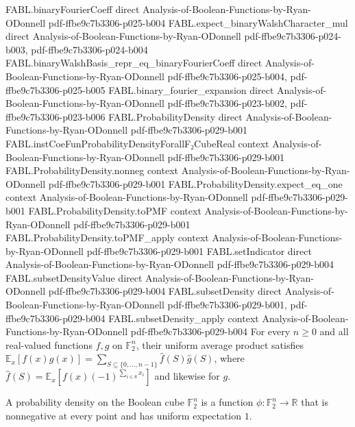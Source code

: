 \begin{theorem}
\proofstep
  {FABL.binaryFourierCoeff}
  {direct}
  {Analysis-of-Boolean-Functions-by-Ryan-ODonnell}
  {pdf-ffbe9c7b3306-p025-b004}
\proofstep
  {FABL.expect_binaryWalshCharacter_mul}
  {direct}
  {Analysis-of-Boolean-Functions-by-Ryan-ODonnell}
  {pdf-ffbe9c7b3306-p024-b003,
    pdf-ffbe9c7b3306-p024-b004}
\proofstep
  {FABL.binaryWalshBasis_repr_eq_binaryFourierCoeff}
  {direct}
  {Analysis-of-Boolean-Functions-by-Ryan-ODonnell}
  {pdf-ffbe9c7b3306-p025-b004,
    pdf-ffbe9c7b3306-p025-b005}
\proofstep
  {FABL.binary_fourier_expansion}
  {direct}
  {Analysis-of-Boolean-Functions-by-Ryan-ODonnell}
  {pdf-ffbe9c7b3306-p023-b002,
    pdf-ffbe9c7b3306-p023-b006}
\proofstep
  {FABL.ProbabilityDensity}
  {direct}
  {Analysis-of-Boolean-Functions-by-Ryan-ODonnell}
  {pdf-ffbe9c7b3306-p029-b001}
\proofstep
  {FABL.instCoeFunProbabilityDensityForallF₂CubeReal}
  {context}
  {Analysis-of-Boolean-Functions-by-Ryan-ODonnell}
  {pdf-ffbe9c7b3306-p029-b001}
\proofstep
  {FABL.ProbabilityDensity.nonneg}
  {context}
  {Analysis-of-Boolean-Functions-by-Ryan-ODonnell}
  {pdf-ffbe9c7b3306-p029-b001}
\proofstep
  {FABL.ProbabilityDensity.expect_eq_one}
  {context}
  {Analysis-of-Boolean-Functions-by-Ryan-ODonnell}
  {pdf-ffbe9c7b3306-p029-b001}
\proofstep
  {FABL.ProbabilityDensity.toPMF}
  {context}
  {Analysis-of-Boolean-Functions-by-Ryan-ODonnell}
  {pdf-ffbe9c7b3306-p029-b001}
\proofstep
  {FABL.ProbabilityDensity.toPMF_apply}
  {context}
  {Analysis-of-Boolean-Functions-by-Ryan-ODonnell}
  {pdf-ffbe9c7b3306-p029-b001}
\proofstep
  {FABL.setIndicator}
  {direct}
  {Analysis-of-Boolean-Functions-by-Ryan-ODonnell}
  {pdf-ffbe9c7b3306-p029-b004}
\proofstep
  {FABL.subsetDensityValue}
  {direct}
  {Analysis-of-Boolean-Functions-by-Ryan-ODonnell}
  {pdf-ffbe9c7b3306-p029-b004}
\proofstep
  {FABL.subsetDensity}
  {direct}
  {Analysis-of-Boolean-Functions-by-Ryan-ODonnell}
  {pdf-ffbe9c7b3306-p029-b001,
    pdf-ffbe9c7b3306-p029-b004}
\proofstep
  {FABL.subsetDensity_apply}
  {context}
  {Analysis-of-Boolean-Functions-by-Ryan-ODonnell}
  {pdf-ffbe9c7b3306-p029-b004}
For every $n\ge 0$ and all real-valued functions $f,g$ on $\mathbb F_2^n$, their uniform
average product satisfies $\mathbb
E_x[f(x)g(x)]=\sum_{S\subseteq\{0,\ldots,n-1\}}\widehat f(S)\widehat g(S)$, where
$\widehat f(S)=\mathbb E_x[f(x)(-1)^{\sum_{i\in S}x_i}]$ and likewise for $g$.
\end{theorem}

\begin{definition}
\label{FABL.ProbabilityDensity}
\leanok
A probability density on the Boolean cube $\mathbb{F}_2^n$ is a function
$\phi:\mathbb{F}_2^n\to\mathbb{R}$ that is nonnegative at every point and has
uniform expectation $1$.
\end{definition}

